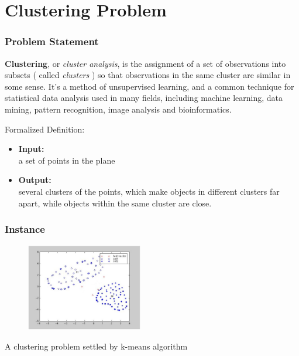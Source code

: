 \documentclass[slidestop,compress,mathserif]{beamer}
\begin{document}
\section{Clustering Problem}
\frame
{
\frametitle{Problem Statement}
{\bf Clustering}, or \emph {cluster analysis}, is the assignment of a set of observations into subsets ( called \emph{clusters} ) so that observations in the same cluster are similar in some sense. It's a method of unsupervised learning, and a common technique for statistical data analysis used in many fields, including machine learning, data mining, pattern recognition, image analysis and bioinformatics. 
\begin{block}{Formalized Definition:}
	\begin{itemize}
		\item {\bf Input:}\\ a set of points in the plane
		\item {\bf Output:}\\ several clusters of the points, which make objects in different clusters far apart, while objects within the same cluster are close.
	\end {itemize}
\end{block}
}

\frame
{
\frametitle{Instance}
\begin{figure}
	\includegraphics[width=2in]{KMeans.eps}
\end{figure}
\begin{center}
	A clustering problem settled by k-means algorithm
\end{center}
}
\end{document}
